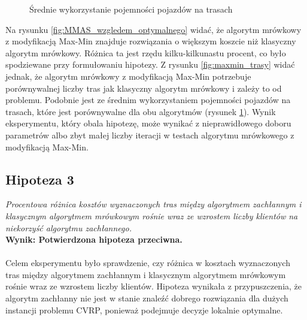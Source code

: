 \documentclass{article}
\begin{document}
\begin{figure}[H]
\begin{minipage}{0.48\textwidth}
        \caption{Średnie wykorzystanie pojemności pojazdów na trasach}
        \label{fig:max_min_capacity}
    \end{minipage}
\end{figure}

\noindent Na rysunku \ref{fig:MMAS_wzgledem_optymalnego} widać, że algorytm mrówkowy z modyfikacją Max-Min znajduje rozwiązania o większym koszcie niż klasyczny algorytm mrówkowy. Różnica ta jest rzędu kilku-kilkunastu procent, co było spodziewane przy formułowaniu hipotezy. Z rysunku \ref{fig:maxmin_trasy} widać jednak, że algorytm mrówkowy z modyfikacją Max-Min potrzebuje porównywalnej liczby tras jak klasyczny algorytm mrówkowy i zależy to od problemu. Podobnie jest ze średnim wykorzystaniem pojemności pojazdów na trasach, które jest porównywalne dla obu algorytmów (rysunek \ref{fig:max_min_capacity}). Wynik eksperymentu, który obala hipotezę, może wynikać z nieprawidłowego doboru parametrów albo zbyt małej liczby iteracji w testach algorytmu mrówkowego z modyfikacją Max-Min.

\subsection{Hipoteza 3}
\textit{Procentowa różnica kosztów wyznaczonych tras między algorytmem zachłannym i klasycznym algorytmem mrówkowym rośnie wraz ze wzrostem liczby klientów na niekorzyść algorytmu zachłannego.}
\\
\textbf{Wynik: Potwierdzona hipoteza przeciwna.}
\\ \\
Celem eksperymentu było sprawdzenie, czy różnica w kosztach wyznaczonych tras między algorytmem zachłannym i klasycznym algorytmem mrówkowym rośnie wraz ze wzrostem liczby klientów. Hipoteza wynikała z przypuszczenia, że algorytm zachłanny nie jest w stanie znaleźć dobrego rozwiązania dla dużych instancji problemu CVRP, ponieważ podejmuje decyzje lokalnie optymalne.
\end{document}
